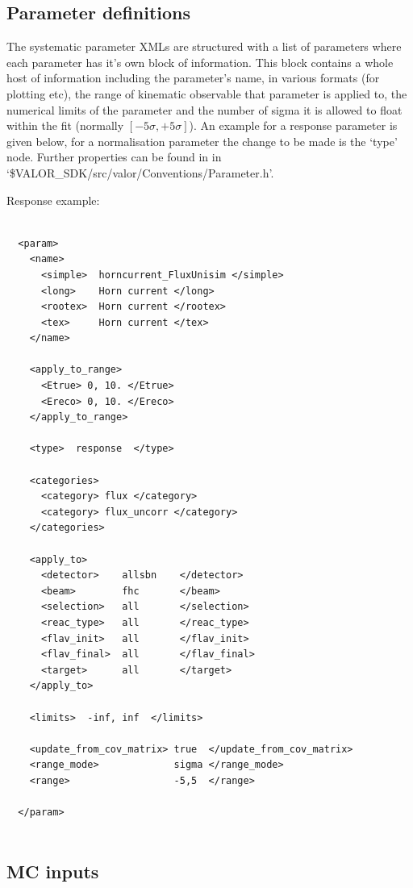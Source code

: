 \subsection{Parameter definitions}
\label{sec:config/params}


The systematic parameter XMLs are structured with a list of parameters where each parameter has it's own block of information. This block contains a whole host of information including the parameter's name, in various formats (for plotting etc), the range of kinematic observable that parameter is applied to, the numerical limits of the parameter and the number of sigma it is allowed to float within the fit (normally $[-5\sigma,+5\sigma]$). An example for a response parameter is given below, for a normalisation parameter the change to be made is the `type' node. Further properties can be found in in `\$VALOR\_SDK/src/valor/Conventions/Parameter.h'.

Response example:
{\color{capri}
\begin{verbatim}

  <param>
    <name>
      <simple>  horncurrent_FluxUnisim </simple>
      <long>    Horn current </long>
      <rootex>  Horn current </rootex>
      <tex>     Horn current </tex>
    </name>
    
    <apply_to_range>
      <Etrue> 0, 10. </Etrue>
      <Ereco> 0, 10. </Ereco>
    </apply_to_range>
    
    <type>  response  </type>
    
    <categories>
      <category> flux </category>
      <category> flux_uncorr </category>
    </categories>
    
    <apply_to>
      <detector>    allsbn    </detector>
      <beam>        fhc       </beam>
      <selection>   all       </selection>
      <reac_type>   all       </reac_type>
      <flav_init>   all       </flav_init>
      <flav_final>  all       </flav_final>
      <target>      all       </target>
    </apply_to>
    
    <limits>  -inf, inf  </limits>
    
    <update_from_cov_matrix> true  </update_from_cov_matrix>
    <range_mode>             sigma </range_mode>            
    <range>                  -5,5  </range>                 

  </param>
    
\end{verbatim}
}

\subsection{MC inputs}
\label{sec:config/mc}

